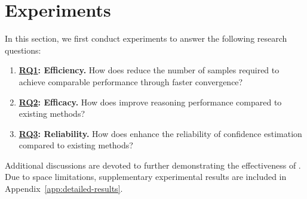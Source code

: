 \section{Experiments}
\label{sec:exp}

In this section, we first conduct experiments to answer the following research questions:
\begin{enumerate}[leftmargin=2pt,itemsep=1pt,parsep=0pt,topsep=3pt]
\item[] \textbf{\underline{RQ1}: Efficiency.} How does \RPC reduce the number of samples required to achieve comparable performance through faster convergence?
\item[] \textbf{\underline{RQ2}: Efficacy.} How does \RPC improve reasoning performance compared to existing methods?
\item[] \textbf{\underline{RQ3}: Reliability.} How does \RPC enhance the reliability of confidence estimation compared to existing methods?
\end{enumerate}
Additional discussions are devoted to further demonstrating the effectiveness of \RPC. 
Due to space limitations, supplementary experimental results are included in Appendix~\ref{app:detailed-results}.

